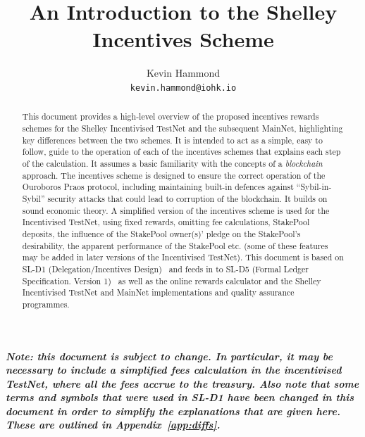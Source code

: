 \documentclass[11pt,a4paper,dvipsnames,twosided,final]{article}
\begin{document}
\pagestyle{empty}
\cleardoublepage


\title{An Introduction to the Shelley Incentives Scheme}

\author{Kevin Hammond  \\ {\small \texttt{kevin.hammond@iohk.io}}}

\maketitle

\begin{abstract}
  \noindent
  This document provides a high-level overview of the proposed incentives rewards schemes for
  the Shelley Incentivised TestNet and the subsequent MainNet, highlighting key
  differences between the two schemes.  It is intended to act as a
  simple, easy to follow, guide to the operation of each of the incentives schemes that explains each step of the calculation.
  It assumes a basic familiarity with the concepts of a \emph{blockchain} approach.
  The incentives scheme is designed to ensure the correct operation of the Ouroboros Praos
  protocol, including maintaining built-in defences against ``Sybil-in-Sybil'' security attacks
  that could lead to corruption of the blockchain.  It builds on sound economic theory.
  A simplified version of the incentives scheme is used for the Incentivised TestNet, using fixed rewards,
  omitting fee calculations, StakePool deposits, the influence of the StakePool owner(s)' pledge on
  the StakePool's desirability, the apparent performance of the StakePool etc. (some of these features may be
  added in later versions of the Incentivised TestNet).
  This document is based on SL-D1 (Delegation/Incentives Design)~\cite{delegation_design} and feeds in to SL-D5
  (Formal Ledger Specification. Version 1)~\cite{shelley_spec} as well as the online rewards calculator and the Shelley Incentivised TestNet and MainNet  implementations and quality assurance programmes.
\end{abstract}

\vspace{3.5in}
\noindent
\textbf{\emph{Note: this document is subject to change.  In particular, it may be necessary to include a simplified fees calculation
    in the incentivised TestNet, where all the fees accrue to the treasury.
Also note that some terms and symbols that were used in SL-D1 have been changed in this document
in order to simplify the explanations that are given here.  These are outlined in Appendix~\ref{app:diffs}.
}}
\end{document}
